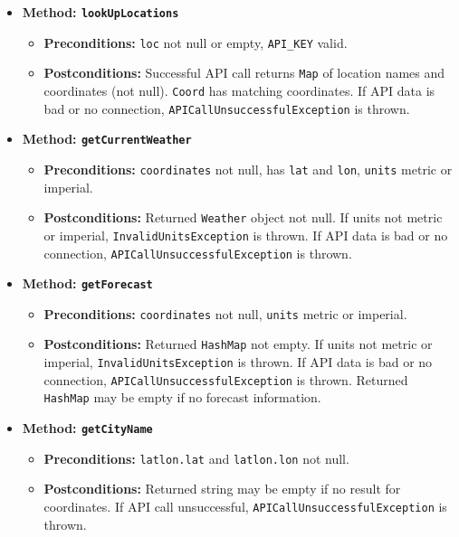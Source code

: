 \documentclass[a4paper,10pt]{article}
\begin{document}
\begin{itemize}
    \item \textbf{Method: \texttt{lookUpLocations}}
    \begin{itemize}
        \item \textbf{Preconditions:} \texttt{loc} not null or empty, \texttt{API\_KEY} valid.
        \item \textbf{Postconditions:} Successful API call returns \texttt{Map} of location names and coordinates (not null). \texttt{Coord} has matching coordinates. If API data is bad or no connection, \texttt{APICallUnsuccessfulException} is thrown.
    \end{itemize}
    
    \item \textbf{Method: \texttt{getCurrentWeather}}
    \begin{itemize}
        \item \textbf{Preconditions:} \texttt{coordinates} not null, has \texttt{lat} and \texttt{lon}, \texttt{units} metric or imperial.
        \item \textbf{Postconditions:} Returned \texttt{Weather} object not null. If units not metric or imperial, \texttt{InvalidUnitsException} is thrown. If API data is bad or no connection, \texttt{APICallUnsuccessfulException} is thrown.
    \end{itemize}

    \item \textbf{Method: \texttt{getForecast}}
    \begin{itemize}
        \item \textbf{Preconditions:} \texttt{coordinates} not null, \texttt{units} metric or imperial.
        \item \textbf{Postconditions:} Returned \texttt{HashMap} not empty. If units not metric or imperial, \texttt{InvalidUnitsException} is thrown. If API data is bad or no connection, \texttt{APICallUnsuccessfulException} is thrown. Returned \texttt{HashMap} may be empty if no forecast information.
    \end{itemize}
    
    \item \textbf{Method: \texttt{getCityName}}
    \begin{itemize}
        \item \textbf{Preconditions:} \texttt{latlon.lat} and \texttt{latlon.lon} not null.
        \item \textbf{Postconditions:} Returned string may be empty if no result for coordinates. If API call unsuccessful, \texttt{APICallUnsuccessfulException} is thrown.
    \end{itemize}
\end{itemize}
\end{document}
